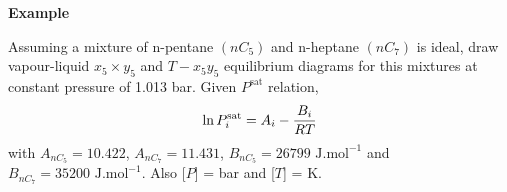   \medskip
   \begin{MyExample}{\begin{center}{\bf Example}\end{center}}
     \begin{example}\label{Chapter:VLE:Example2}
       Assuming a mixture of n-pentane $\left(nC_{5}\right)$ and n-heptane $\left(nC_{7}\right)$ is ideal, draw vapour-liquid $x_{5}\times y_{5}$ and $T-x_{5}y_{5}$ equilibrium diagrams for this mixtures at constant pressure of 1.013 bar. Given $P^{\text{sat}}$ relation,
    \begin{displaymath}
      \ln{P_{i}^{\text{sat}}} = A_{i} - \displaystyle\frac{B_{i}}{RT}
    \end{displaymath}
    with $A_{nC_{5}}=10.422$, $A_{nC_{7}}=11.431$, $B_{nC_{5}}=26799 \text{ J.mol}^{-1}$ and $B_{nC_{7}}=35200 \text{ J.mol}^{-1}$. Also [$P$] = bar and [$T$] = K.
     \end{example}


\end{MyExample}
